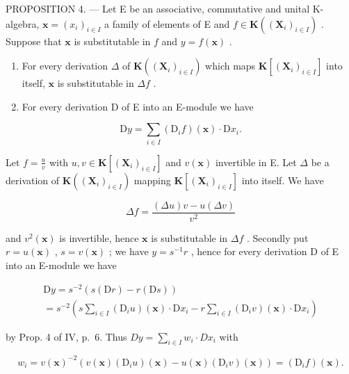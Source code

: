 PROPOSITION 4. --- Let E be an associative, commutative and unital K-algebra, \(\mathbf{x} = (x_i)_{i \in I}\) a family of elements of E and \(f \in \mathbf{K}((\mathbf{X}_i)_{i \in I})\) . Suppose that \(\mathbf{x}\) is substitutable in \(f\) and \(y = f(\mathbf{x})\) .

\begin{enumerate}
\def\labelenumi{(\roman{enumi})}
\item
  For every derivation \(\Delta\) of \(\mathbf{K}((\mathbf{X}_i)_{i\in I})\) which maps \(\mathbf{K}[(\mathbf{X}_i)_{i\in I}]\) into itself, \(\mathbf{x}\) is substitutable in \(\Delta f\) .
\item
  For every derivation D of E into an E-module we have
\end{enumerate}

\[
\mathrm{D} y = \sum_ {i \in I} (\mathrm{D} _ {i} f) (\mathbf {x}) \cdot \mathrm{D} x _ {i}.
\]

Let \(f = \frac{u}{v}\) with \(u, v \in \mathbf{K}[(\mathbf{X}_i)_{i \in I}]\) and \(v(\mathbf{x})\) invertible in E. Let \(\Delta\) be a derivation of \(\mathbf{K}((\mathbf{X}_i)_{i \in I})\) mapping \(\mathbf{K}[(\mathbf{X}_i)_{i \in I}]\) into itself. We have

\[
\Delta f = \frac {(\Delta u) v - u (\Delta v)}{v ^ {2}}
\]

and \(v^2(\mathbf{x})\) is invertible, hence \(\mathbf{x}\) is substitutable in \(\Delta f\) . Secondly put \(r = u(\mathbf{x})\) , \(s = v(\mathbf{x})\) ; we have \(y = s^{-1}r\) , hence for every derivation D of E into an E-module we have

\[
\begin{array}{l} \mathrm{D} y = s ^ {- 2} (s (\mathrm{D} r) - r (\mathrm{D} s)) \\ = s ^ {- 2} \left(s \sum_ {i \in I} (\mathrm{D} _ {i} u) (\mathbf {x}) \cdot \mathrm{D} x _ {i} - r \sum_ {i \in I} (\mathrm{D} _ {i} v) (\mathbf {x}) \cdot \mathrm{D} x _ {i}\right) \end{array}
\]

by Prop. 4 of IV, p.~6. Thus \(Dy = \sum_{i \in I} w_i \cdot Dx_i\) with

\[
w _ {i} = v (\mathbf {x}) ^ {- 2} (v (\mathbf {x}) \left(\mathrm{D} _ {i} u\right) (\mathbf {x}) - u (\mathbf {x}) \left(\mathrm{D} _ {i} v\right) (\mathbf {x})) = \left(\mathrm{D} _ {i} f\right) (\mathbf {x}).
\]

